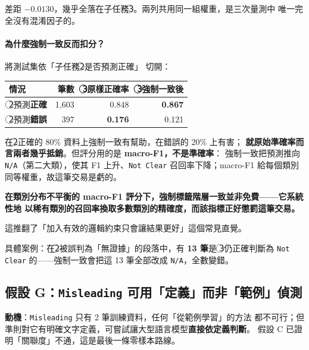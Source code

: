 \documentclass[11pt,a4paper]{ctexart}
\newcommand{\fieldname}[1]{\texttt{#1}}
\begin{document}
差距 $-0.0130$，幾乎全落在子任務\textcircled{3}。兩列共用同一組權重，是三次量測中
唯一完全沒有混淆因子的。

\paragraph{為什麼強制一致反而扣分？} 將測試集依「子任務\textcircled{2}是否預測正確」
切開：

\begin{table}[h]
\centering
\small
\begin{tabular}{@{}lrrr@{}}
\toprule
情況 & 筆數 & \textcircled{3}原樣正確率 & \textcircled{3}強制一致後 \\
\midrule
\textcircled{2}預測\textbf{正確} & 1{,}603 & 0.848 & \textbf{0.867} \\
\textcircled{2}預測\textbf{錯誤} & 397     & \textbf{0.176} & 0.121 \\
\bottomrule
\end{tabular}
\end{table}

在\textcircled{2}正確的 80\% 資料上強制一致有幫助，在錯誤的 20\% 上有害；
\textbf{就原始準確率而言兩者幾乎抵銷}。但評分用的是 \textbf{macro-F1，不是準確率}：
強制一致把預測推向 \fieldname{N/A}（第二大類），使其 F1 上升、\fieldname{Not Clear}
召回率下降；macro-F1 給每個類別同等權重，故這筆交易是虧的。

\begin{tcolorbox}[colback=blue!5, colframe=blue!55, title=本研究最主要的發現]
\textbf{在類別分布不平衡的 macro-F1 評分下，強制標籤階層一致並非免費——它系統性地
以稀有類別的召回率換取多數類別的精確度，而該指標正好懲罰這筆交易。}

\medskip
這推翻了「加入有效的邏輯約束只會讓結果更好」這個常見直覺。
\end{tcolorbox}

具體案例：在\textcircled{2}被誤判為「無證據」的段落中，有 \textbf{13 筆}是
\textcircled{3}仍正確判斷為 \fieldname{Not Clear} 的——強制一致會把這 13 筆全部改成
\fieldname{N/A}，全數變錯。

\subsection*{假設 G：\fieldname{Misleading} 可用「定義」而非「範例」偵測}

\textbf{動機}：\fieldname{Misleading} 只有 2 筆訓練資料，任何「從範例學習」的方法
都不可行；但準則對它有明確文字定義，可嘗試讓大型語言模型\textbf{直接依定義判斷}。
假設 C 已證明「關聯度」不通，這是最後一條零樣本路線。
\end{document}
